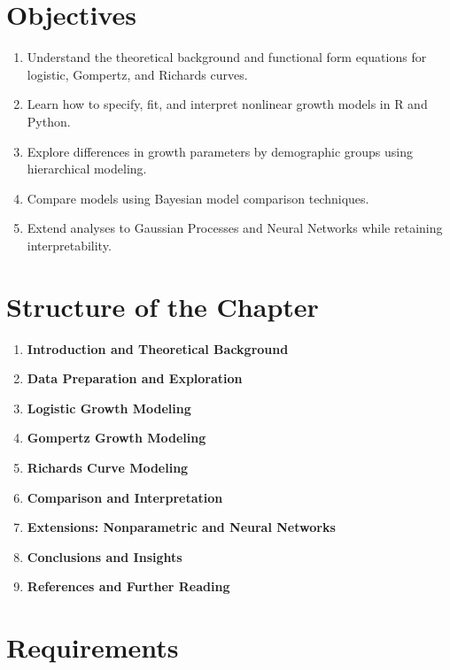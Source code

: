 \documentclass[
  letterpaper,
  DIV=11,
  numbers=noendperiod]{scrreprt}
\providecommand{\tightlist}{%
  \setlength{\itemsep}{0pt}\setlength{\parskip}{0pt}}\usepackage{longtable,booktabs,array}
\begin{document}
\section{Objectives}\label{objectives}

\begin{enumerate}
\def\labelenumi{\arabic{enumi}.}
\tightlist
\item
  Understand the theoretical background and functional form equations
  for logistic, Gompertz, and Richards curves.
\item
  Learn how to specify, fit, and interpret nonlinear growth models in R
  and Python.
\item
  Explore differences in growth parameters by demographic groups using
  hierarchical modeling.
\item
  Compare models using Bayesian model comparison techniques.
\item
  Extend analyses to Gaussian Processes and Neural Networks while
  retaining interpretability.
\end{enumerate}

\section{Structure of the Chapter}\label{structure-of-the-chapter}

\begin{enumerate}
\def\labelenumi{\arabic{enumi}.}
\tightlist
\item
  \textbf{Introduction and Theoretical Background}
\item
  \textbf{Data Preparation and Exploration}
\item
  \textbf{Logistic Growth Modeling}
\item
  \textbf{Gompertz Growth Modeling}
\item
  \textbf{Richards Curve Modeling}
\item
  \textbf{Comparison and Interpretation}
\item
  \textbf{Extensions: Nonparametric and Neural Networks}
\item
  \textbf{Conclusions and Insights}
\item
  \textbf{References and Further Reading}
\end{enumerate}

\section{Requirements}\label{requirements}
\end{document}
